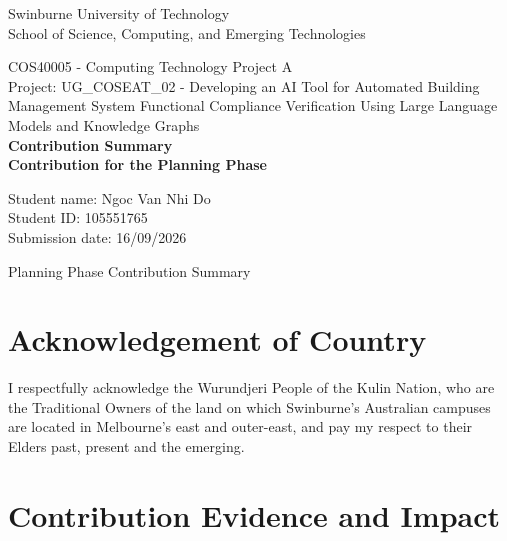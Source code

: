 \documentclass{article}
\begin{document}
\begin{titlepage}
\begin{center}
\vspace*{1cm}

Swinburne University of Technology \\
School of Science, Computing, and Emerging Technologies
\vspace{8cm}

COS40005 - Computing Technology Project A \\
Project: UG\_COSEAT\_02 - Developing an AI Tool for Automated Building Management System Functional Compliance Verification Using Large Language Models and Knowledge Graphs \\
\vspace{1em}
\textbf{Contribution Summary} \\
\textbf{Contribution for the Planning Phase}
\vfill

Student name: Ngoc Van Nhi Do \\
Student ID: 105551765 \\
Submission date: 16/09/2026
\end{center}
\end{titlepage}

\pagestyle{fancy}
\fancyfoot{}
\renewcommand{\footrulewidth}{0.4pt} %
\fancyfoot[R]{\small\thepage}


\begin{center}
\vspace*{2px}
{\Large
\setlength{\baselineskip}{2em}
Planning Phase Contribution Summary
}
\end{center}

\section*{Acknowledgement of Country}

I respectfully acknowledge the Wurundjeri People of the Kulin Nation, who are the Traditional Owners of the land on which Swinburne's Australian campuses are located in Melbourne's east and outer-east, and pay my respect to their Elders past, present and the emerging.

\section{Contribution Evidence and Impact}
\end{document}
